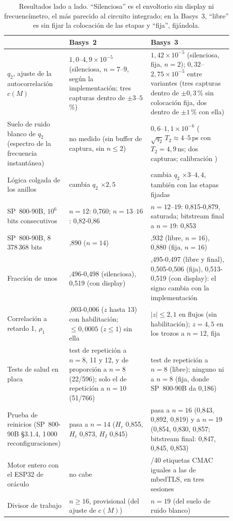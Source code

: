 \begin{table}[htbp]
\centering\small
\caption{Resultados lado a lado. ``Silenciosa'' es el envoltorio sin
display ni frecuencímetro, el más parecido al circuito integrado; en la
Basys~3, ``libre'' es sin fijar la colocación de las etapas y ``fija'',
fijándola.}
\label{tab:app_fpga_res}
\begin{tabular}{@{}>{\raggedright\arraybackslash}p{0.22\linewidth}>{\raggedright\arraybackslash}p{0.35\linewidth}>{\raggedright\arraybackslash}p{0.35\linewidth}@{}}
\toprule
 & Basys~2 & Basys~3 \\
\midrule
$q_2$, ajuste de la autocorrelación $c(M)$ & $1{,}0$--$4{,}9\times10^{-5}$
  (silenciosa, $n = 7$--$9$, según la implementación; tres capturas
  dentro de $\pm3$--$5$\,\%) & $1{,}42\times10^{-5}$ (silenciosa, fija,
  $n = 2$); $0{,}32$--$2{,}75\times10^{-5}$ entre variantes (tres capturas
  dentro de $\pm0{,}3$\,\% sin colocación fija, dos dentro de $\pm1$\,\%
  con ella) \\
Suelo de ruido blanco de $q_2$ (espectro de la frecuencia instantánea) &
  no medido (sin buffer de captura, sin $n \le 2$) &
  $0{,}6$--$1{,}1\times10^{-6}$ ($\sqrt{q_2}\,T_2 \approx 4$--$5$\,ps con
  $T_2 = 4{,}9$\,ns; dos capturas; calibración \simu{}) \\
Lógica colgada de los anillos & cambia $q_2$ $\times2{,}5$ & cambia $q_2$
  $\times3$--$4{,}4$, también con las etapas fijadas \\
SP~800-90B, $10^6$ bits consecutivos & $n = 12$: 0,760; $n = 13$--$16$:
  0,82-0,86 & $n = 12$--$19$: 0,815-0,879, saturada; bitstream final a
  $n = 19$: 0,853 \\
SP~800-90B, 8\,378\,368 bits & 0,890 ($n = 14$) & 0,932 (libre, $n = 16$),
  0,880 (fija, $n = 16$) \\
Fracción de unos & 0,496-0,498 (silenciosa), 0,519 (con display) &
  0,495-0,497 (libre y final), 0,505-0,506 (fija), 0,513-0,519 (con
  display): el signo cambia con la implementación \\
Correlación a retardo 1, $\rho_1$ & 0,003-0,006 ($z$ hasta 13) con
  habilitación; $\le 0{,}0005$ ($z \le 1$) sin ella & $|z| \le 2{,}1$ en flujos (sin
  habilitación); $z = 4{,}5$ en los trozos a $n = 12$, fija \\
Tests de salud en placa & test de repetición a $n = 8$, 11 y 12, y de
  proporción a $n = 8$ (22/596); solo el de repetición a $n = 10$
  (51/766) & test de repetición a $n = 8$ (libre); ninguno ni a $n = 8$
  (fija, donde SP~800-90B da 0,186) \\
Prueba de reinicios (SP~800-90B \S3.1.4, 1\,000 reconfiguraciones) & pasa
  a $n = 14$ ($H_r$ 0,855, $H_c$ 0,873, $H_I$ 0,845) & pasa a $n = 16$
  (0,843, 0,892, 0,819) y a $n = 19$ (0,854, 0,830, 0,857; bitstream
  final: 0,847, 0,845, 0,853) \\
Motor entero con el ESP32 de oráculo & no cabe & 40/40 etiquetas
  \acs{CMAC} iguales a las de mbedTLS, en tres sesiones \\
Divisor de trabajo & $n \ge 16$, provisional (del ajuste de $c(M)$) &
  $n = 19$ (del suelo de ruido blanco) \\
\bottomrule
\end{tabular}
\end{table}

